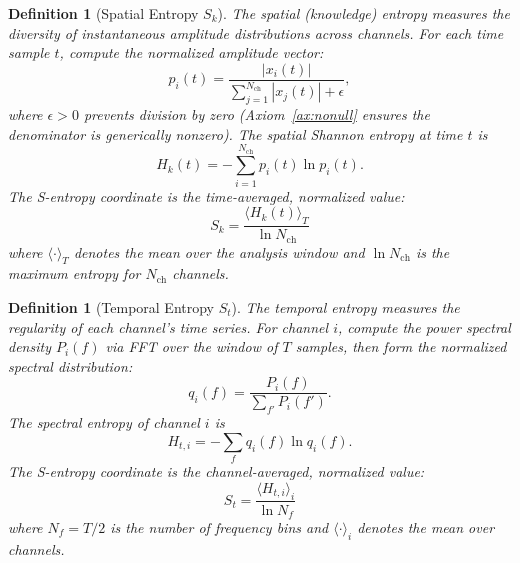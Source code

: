 \documentclass[11pt,twocolumn,a4paper]{article}
\newtheorem{definition}[theorem]{Definition}
\newcommand{\Sk}{S_k}
\newcommand{\St}{S_t}
\begin{document}
\begin{definition}[Spatial Entropy $\Sk$]
\label{def:sk}
The spatial (knowledge) entropy measures the diversity of instantaneous amplitude distributions across channels.
For each time sample $t$, compute the normalized amplitude vector:
\begin{equation}
p_i(t) = \frac{|x_i(t)|}{\sum_{j=1}^{N_{\mathrm{ch}}} |x_j(t)| + \epsilon},
\end{equation}
where $\epsilon > 0$ prevents division by zero (Axiom~\ref{ax:nonull} ensures the denominator is generically nonzero).
The spatial Shannon entropy at time $t$ is
\begin{equation}
H_k(t) = -\sum_{i=1}^{N_{\mathrm{ch}}} p_i(t) \ln p_i(t).
\end{equation}
The S-entropy coordinate is the time-averaged, normalized value:
\begin{equation}
\boxed{\Sk = \frac{\langle H_k(t) \rangle_T}{\ln N_{\mathrm{ch}}}}
\label{eq:sk}
\end{equation}
where $\langle \cdot \rangle_T$ denotes the mean over the analysis window and $\ln N_{\mathrm{ch}}$ is the maximum entropy for $N_{\mathrm{ch}}$ channels.
\end{definition}

\begin{definition}[Temporal Entropy $\St$]
\label{def:st}
The temporal entropy measures the regularity of each channel's time series.
For channel $i$, compute the power spectral density $P_i(f)$ via FFT over the window of $T$ samples, then form the normalized spectral distribution:
\begin{equation}
q_i(f) = \frac{P_i(f)}{\sum_{f'} P_i(f')}.
\end{equation}
The spectral entropy of channel $i$ is
\begin{equation}
H_{t,i} = -\sum_f q_i(f) \ln q_i(f).
\end{equation}
The S-entropy coordinate is the channel-averaged, normalized value:
\begin{equation}
\boxed{\St = \frac{\langle H_{t,i} \rangle_{i}}{\ln N_f}}
\label{eq:st}
\end{equation}
where $N_f = T/2$ is the number of frequency bins and $\langle \cdot \rangle_i$ denotes the mean over channels.
\end{definition}
\end{document}
